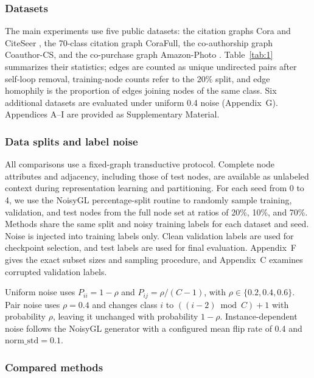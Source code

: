 \documentclass[10pt,letterpaper,nopreprintline]{elsarticle}
\theoremstyle{plain}
\begin{document}
\subsubsection{Datasets}\label{sec:4.1.1}

The main experiments use five public datasets: the citation graphs Cora and CiteSeer \cite{ref69}, the 70-class citation graph CoraFull, the co-authorship graph Coauthor-CS, and the co-purchase graph Amazon-Photo \cite{ref70}. Table~\ref{tab:1} summarizes their statistics; edges are counted as unique undirected pairs after self-loop removal, training-node counts refer to the 20\% split, and edge homophily is the proportion of edges joining nodes of the same class. Six additional datasets are evaluated under uniform 0.4 noise (Appendix~G). Appendices A--I are provided as Supplementary Material.



\subsubsection{Data splits and label noise}\label{sec:4.1.2}

All comparisons use a fixed-graph transductive protocol. Complete node attributes and adjacency, including those of test nodes, are available as unlabeled context during representation learning and partitioning. For each seed from 0 to 4, we use the NoisyGL percentage-split routine to randomly sample training, validation, and test nodes from the full node set at ratios of 20\%, 10\%, and 70\%. Methods share the same split and noisy training labels for each dataset and seed. Noise is injected into training labels only. Clean validation labels are used for checkpoint selection, and test labels are used for final evaluation. Appendix~F gives the exact subset sizes and sampling procedure, and Appendix~C examines corrupted validation labels.

Uniform noise uses \(P_{ii} = 1 - \rho\) and \(P_{ij} = \rho/(C - 1)\), with \(\rho \in \{ 0.2,0.4,0.6\}\). Pair noise uses \(\rho = 0.4\) and changes class \(i\) to \(((i - 2)\bmod C) + 1\) with probability \(\rho\), leaving it unchanged with probability \(1 - \rho\). Instance-dependent noise follows the NoisyGL generator with a configured mean flip rate of 0.4 and \(\text{norm\_std} = 0.1\).

\subsubsection{Compared methods}\label{sec:4.1.3}
\end{document}
